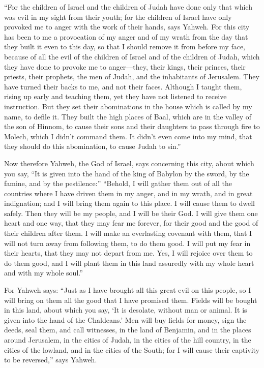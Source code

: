  ``For the children of Israel and the children of Judah
have done only that which was evil in my sight from their youth; for the
children of Israel have only provoked me to anger with the work of their
hands, says Yahweh.  For this city has been to me a
provocation of my anger and of my wrath from the day that they built it
even to this day, so that I should remove it from before my face,
 because of all the evil of the children of Israel and of
the children of Judah, which they have done to provoke me to
anger---they, their kings, their princes, their priests, their prophets,
the men of Judah, and the inhabitants of Jerusalem.  They
have turned their backs to me, and not their faces. Although I taught
them, rising up early and teaching them, yet they have not listened to
receive instruction.  But they set their abominations in
the house which is called by my name, to defile it.  They
built the high places of Baal, which are in the valley of the son of
Hinnom, to cause their sons and their daughters to pass through fire to
Molech, which I didn't command them. It didn't even come into my mind,
that they should do this abomination, to cause Judah to sin.''

 Now therefore Yahweh, the God of Israel, says concerning
this city, about which you say, ``It is given into the hand of the king
of Babylon by the sword, by the famine, and by the pestilence:''
 ``Behold, I will gather them out of all the countries
where I have driven them in my anger, and in my wrath, and in great
indignation; and I will bring them again to this place. I will cause
them to dwell safely.  Then they will be my people, and I
will be their God.  I will give them one heart and one way,
that they may fear me forever, for their good and the good of their
children after them.  I will make an everlasting covenant
with them, that I will not turn away from following them, to do them
good. I will put my fear in their hearts, that they may not depart from
me.  Yes, I will rejoice over them to do them good, and I
will plant them in this land assuredly with my whole heart and with my
whole soul.''

 For Yahweh says: ``Just as I have brought all this great
evil on this people, so I will bring on them all the good that I have
promised them.  Fields will be bought in this land, about
which you say, `It is desolate, without man or animal. It is given into
the hand of the Chaldeans.'  Men will buy fields for money,
sign the deeds, seal them, and call witnesses, in the land of Benjamin,
and in the places around Jerusalem, in the cities of Judah, in the
cities of the hill country, in the cities of the lowland, and in the
cities of the South; for I will cause their captivity to be reversed,''
says Yahweh.

